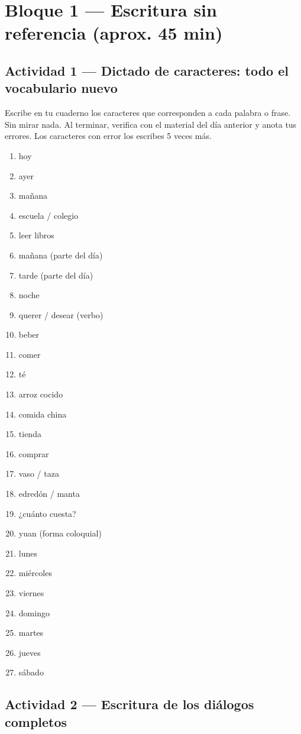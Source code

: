 \documentclass[12pt, a4paper]{article}
\begin{document}
\section{Bloque 1 — Escritura sin referencia (aprox. 45 min)}

\subsection{Actividad 1 — Dictado de caracteres: todo el vocabulario nuevo}

Escribe en tu cuaderno los caracteres que corresponden a cada palabra o frase. Sin mirar nada. Al terminar, verifica con el material del día anterior y anota tus errores. Los caracteres con error los escribes 5 veces más.

\begin{enumerate}[leftmargin=1.5cm, itemsep=2pt]
\item hoy
\item ayer
\item mañana
\item escuela / colegio
\item leer libros
\item mañana (parte del día)
\item tarde (parte del día)
\item noche
\item querer / desear (verbo)
\item beber
\item comer
\item té
\item arroz cocido
\item comida china
\item tienda
\item comprar
\item vaso / taza
\item edredón / manta
\item ¿cuánto cuesta?
\item yuan (forma coloquial)
\item lunes
\item miércoles
\item viernes
\item domingo
\item martes
\item jueves
\item sábado
\end{enumerate}

\subsection{Actividad 2 — Escritura de los diálogos completos}
\end{document}
